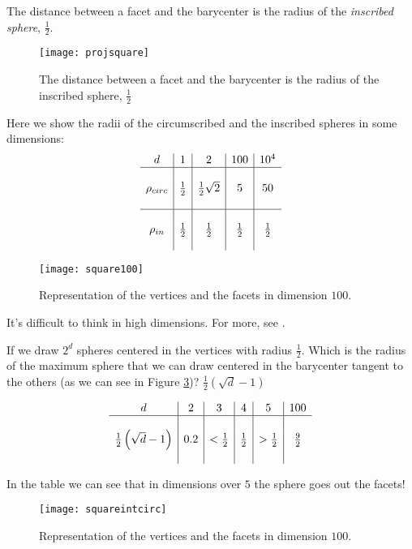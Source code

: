 \begin{obs}
 The distance between a facet and the barycenter is the radius of the \emph{inscribed sphere}, $\frac{1}{2}$.
\begin{figure}[htbp]
  \centering
  \texttt{[image: projsquare]}
  
  \caption{The distance between a facet and the barycenter is the radius of the inscribed sphere, $\frac{1}{2}$}
\label{fig:intro:5}
\end{figure}
\end{obs}

Here we show the radii of the circumscribed and the inscribed spheres in some dimensions:
$$\begin{array}{c|c|c|c|c}
   d&1&2&100&10^4\\
   \hline
   &&&&\\
   \rho_{circ}&\frac{1}{2}&\frac{1}{2}\sqrt{2}&5&50\\
   &&&&\\
   \hline
   &&&&\\
   \rho_{in}&\frac{1}{2}&\frac{1}{2}&\frac{1}{2}&\frac{1}{2}\\
   &&&&\\
  \end{array}
$$
\begin{figure}[htbp]
  \centering
  \texttt{[image: square100]}
  
  \caption{Representation of the vertices and the facets in dimension $100$. }
\label{fig:intro:6}
\end{figure}

It's difficult to think in high dimensions. For more, see \cite{Ball}.

\begin{obs}
 If we draw $2^d$ spheres centered in the vertices with radius $\frac{1}{2}$. Which is the radius of the maximum sphere that we can draw centered in the barycenter tangent to the others (as we can see in Figure \ref{fig:intro:7})? $\frac{1}{2}\left(\sqrt{d}-1\right)$

$$\begin{array}{c|c|c|c|c|c}
   d&2&3&4&5&100\\
   \hline
   &&&&&\\
   \frac{1}{2}\left(\sqrt{d}-1\right)&0.2&<\frac{1}{2}&\frac{1}{2}&>\frac{1}{2}&\frac{9}{2}\\
   &&&&&\\
  \end{array}
$$

In the table we can see that in dimensions over $5$ the sphere goes out the facets!
\end{obs}

\begin{figure}[htbp]
  \centering
  \texttt{[image: squareintcirc]}
  
  \caption{Representation of the vertices and the facets in dimension $100$.}
\label{fig:intro:7}
\end{figure}

